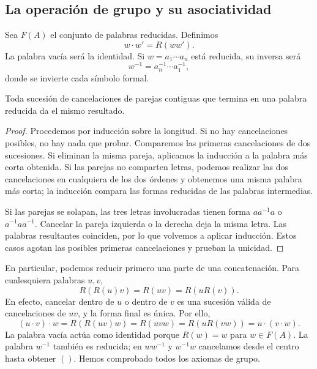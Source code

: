 \subsection{La operación de grupo y su asociatividad}
Sea $F(A)$ el conjunto de palabras reducidas. Definimos
\[
w\cdot w'=R(ww').
\]
La palabra vacía será la identidad. Si $w=a_1\cdots a_n$ está reducida, su inversa será
\[
w^{-1}=a_n^{-1}\cdots a_1^{-1},
\]
donde se invierte cada símbolo formal.

\begin{lema}\label{lema:C3-unicidad-reduccion}
Toda sucesión de cancelaciones de parejas contiguas que termina en una palabra reducida da el mismo resultado.
\end{lema}
\begin{proof}
Procedemos por inducción sobre la longitud. Si no hay cancelaciones posibles, no hay nada que probar. Comparemos las primeras cancelaciones de dos sucesiones. Si eliminan la misma pareja, aplicamos la inducción a la palabra más corta obtenida. Si las parejas no comparten letras, podemos realizar las dos cancelaciones en cualquiera de los dos órdenes y obtenemos una misma palabra más corta; la inducción compara las formas reducidas de las palabras intermedias.

Si las parejas se solapan, las tres letras involucradas tienen forma $aa^{-1}a$ o $a^{-1}aa^{-1}$. Cancelar la pareja izquierda o la derecha deja la misma letra. Las palabras resultantes coinciden, por lo que volvemos a aplicar inducción. Estos casos agotan las posibles primeras cancelaciones y prueban la unicidad.
\end{proof}
En particular, podemos reducir primero una parte de una concatenación. Para cualesquiera palabras $u,v$,
\[
R(R(u)v)=R(uv)=R(uR(v)).
\]
En efecto, cancelar dentro de $u$ o dentro de $v$ es una sucesión válida de cancelaciones de $uv$, y la forma final es única. Por ello,
\[
(u\cdot v)\cdot w=R(R(uv)w)=R(uvw)
=R(uR(vw))=u\cdot(v\cdot w).
\]
La palabra vacía actúa como identidad porque $R(w)=w$ para $w\in F(A)$. La palabra $w^{-1}$ también es reducida; en $ww^{-1}$ y $w^{-1}w$ cancelamos desde el centro hasta obtener $()$. Hemos comprobado todos los axiomas de grupo.


